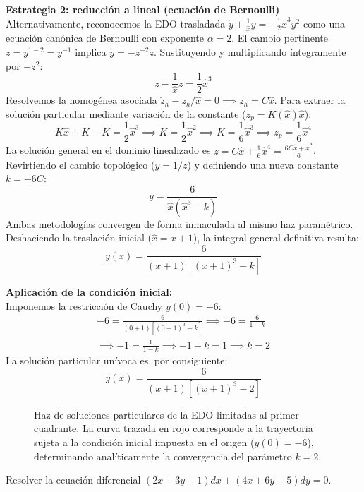 \begin{tcolorbox}
\textbf{Estrategia 2: reducción a lineal (ecuación de Bernoulli)} \\
Alternativamente, reconocemos la EDO trasladada $\dot{y} + \frac{1}{\hat{x}}y = -\frac{1}{2}\hat{x}^3 y^2$ como una ecuación canónica de Bernoulli con exponente $\alpha = 2$.
El cambio pertinente $z = y^{1-2} = y^{-1}$ implica $\dot{y} = -z^{-2}\dot{z}$.
Sustituyendo y multiplicando íntegramente por $-z^2$:
$$ \dot{z} - \frac{1}{\hat{x}}z = \frac{1}{2}\hat{x}^3 $$
Resolvemos la homogénea asociada $\dot{z}_h - z_h/\hat{x} = 0 \implies z_h = C\hat{x}$.
Para extraer la solución particular mediante variación de la constante ($z_p = K(\hat{x})\hat{x}$):
$$ \dot{K}\hat{x} + K - K = \frac{1}{2}\hat{x}^3 \implies \dot{K} = \frac{1}{2}\hat{x}^2 \implies K = \frac{1}{6}\hat{x}^3 \implies z_p = \frac{1}{6}\hat{x}^4 $$
La solución general en el dominio linealizado es $z = C\hat{x} + \frac{1}{6}\hat{x}^4 = \frac{6C\hat{x} + \hat{x}^4}{6}$.
Revirtiendo el cambio topológico ($y = 1/z$) y definiendo una nueva constante $k = -6C$:
$$ y = \frac{6}{\hat{x}(\hat{x}^3 - k)} $$
Ambas metodologías convergen de forma inmaculada al mismo haz paramétrico. Deshaciendo la traslación inicial ($\hat{x} = x+1$), la integral general definitiva resulta:
$$ y(x) = \frac{6}{(x+1)[(x+1)^3 - k]} $$

\textbf{Aplicación de la condición inicial:} \\
Imponemos la restricción de Cauchy $y(0) = -6$:
$$ \begin{gathered} -6 = \frac{6}{(0+1)[(0+1)^3 - k]} \implies -6 = \frac{6}{1 - k} \\ \implies -1 = \frac{1}{1-k} \implies -1 + k = 1 \implies k = 2 \end{gathered} $$
La solución particular unívoca es, por consiguiente:
$$ y(x) = \frac{6}{(x+1)[(x+1)^3 - 2]} $$

\begin{figure}[H]
    \centering
    
    \caption{Haz de soluciones particulares de la EDO limitadas al primer cuadrante. La curva trazada en rojo corresponde a la trayectoria sujeta a la condición inicial impuesta en el origen ($y(0)=-6$), determinando analíticamente la convergencia del parámetro $k=2$.}
\end{figure}
\end{tcolorbox}

\begin{ejercicio}
Resolver la ecuación diferencial $(2x + 3y - 1)dx + (4x + 6y - 5)dy = 0$.
\end{ejercicio}

